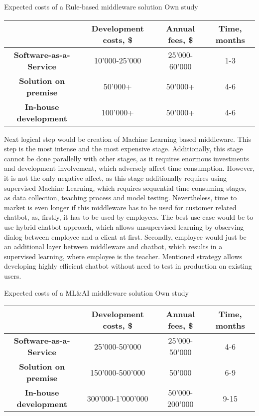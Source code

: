 \mttable
{Expected costs of a Rule-based middleware solution}
{Own study}
{
    \begin{tabular}{| c | c | c | c |}
        \hline
        &
        \textbf{Development costs, \$} & 
        \textbf{Annual fees, \$} &
        \textbf{Time, months} \\ \hline 
       
        \textbf{Software-as-a-Service} & 
            10'000-25'000 & 
            25'000-60'000 &
            1-3 \\ \hline 
       
        \textbf{Solution on premise} & 
            50'000+ &
            50'000+ &
            4-6 \\ \hline 
            
        \textbf{In-house development} &
            100'000+ &
            50'000+ &
            4-6 \\ \hline
    \end{tabular}
}

Next logical step would be creation of Machine Learning based middleware.
This step is the most intense and the most expensive stage.
Additionally, this stage cannot be done parallelly with other stages, as it requires enormous investments and development involvement, which adversely affect time consumption.
However, it is not the only negative affect, as this stage additionally requires using supervised Machine Learning, which requires sequential time-consuming stages, as data collection, teaching process and model testing.
Nevertheless, time to market is even longer if this middleware has to be used for customer related chatbot, as, firstly, it has to be used by employees.
The best use-case would be to use hybrid chatbot approach, which allows unsupervised learning by observing dialog between employee and a client at first.
Secondly, employee would just be an additional layer between middleware and chatbot, which results in a supervised learning, where employee is the teacher.
Mentioned strategy allows developing highly efficient chatbot without need to test in production on existing users.

\mttable
{Expected costs of a ML\&AI middleware solution}
{Own study}
{
    \begin{tabular}{| c | c | c | c |}
        \hline
        &
        \textbf{Development costs, \$} & 
        \textbf{Annual fees, \$} &
        \textbf{Time, months} \\ \hline 
       
        \textbf{Software-as-a-Service} & 
            25'000-50'000 & 
            25'000-50'000 &
            4-6 \\ \hline 
       
        \textbf{Solution on premise} & 
            150'000-500'000 &
            50'000 &
            6-9 \\ \hline 
            
        \textbf{In-house development} &
            300'000-1'000'000 &
            50'000-200'000 &
            9-15 \\ \hline
    \end{tabular}
}


